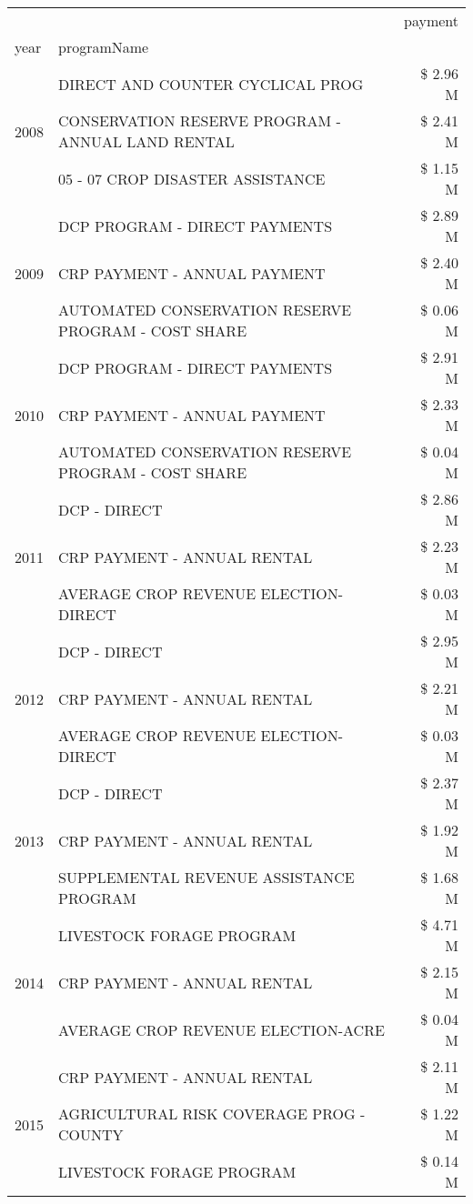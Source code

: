 \begin{tabular}{llr}
\toprule
 &  & payment \\
year & programName &  \\
\midrule
\multirow[t]{3}{*}{2008} & DIRECT AND COUNTER CYCLICAL PROG & \$ 2.96 M \\
 & CONSERVATION RESERVE PROGRAM - ANNUAL LAND RENTAL & \$ 2.41 M \\
 & 05 - 07 CROP DISASTER ASSISTANCE & \$ 1.15 M \\
\cline{1-3}
\multirow[t]{3}{*}{2009} & DCP PROGRAM - DIRECT PAYMENTS & \$ 2.89 M \\
 & CRP PAYMENT - ANNUAL PAYMENT & \$ 2.40 M \\
 & AUTOMATED CONSERVATION RESERVE PROGRAM - COST SHARE & \$ 0.06 M \\
\cline{1-3}
\multirow[t]{3}{*}{2010} & DCP PROGRAM - DIRECT PAYMENTS & \$ 2.91 M \\
 & CRP PAYMENT - ANNUAL PAYMENT & \$ 2.33 M \\
 & AUTOMATED CONSERVATION RESERVE PROGRAM - COST SHARE & \$ 0.04 M \\
\cline{1-3}
\multirow[t]{3}{*}{2011} & DCP - DIRECT & \$ 2.86 M \\
 & CRP PAYMENT - ANNUAL RENTAL & \$ 2.23 M \\
 & AVERAGE CROP REVENUE ELECTION-DIRECT & \$ 0.03 M \\
\cline{1-3}
\multirow[t]{3}{*}{2012} & DCP - DIRECT & \$ 2.95 M \\
 & CRP PAYMENT - ANNUAL RENTAL & \$ 2.21 M \\
 & AVERAGE CROP REVENUE ELECTION-DIRECT & \$ 0.03 M \\
\cline{1-3}
\multirow[t]{3}{*}{2013} & DCP - DIRECT & \$ 2.37 M \\
 & CRP PAYMENT - ANNUAL RENTAL & \$ 1.92 M \\
 & SUPPLEMENTAL REVENUE ASSISTANCE PROGRAM & \$ 1.68 M \\
\cline{1-3}
\multirow[t]{3}{*}{2014} & LIVESTOCK FORAGE PROGRAM & \$ 4.71 M \\
 & CRP PAYMENT - ANNUAL RENTAL & \$ 2.15 M \\
 & AVERAGE CROP REVENUE ELECTION-ACRE & \$ 0.04 M \\
\cline{1-3}
\multirow[t]{3}{*}{2015} & CRP PAYMENT - ANNUAL RENTAL & \$ 2.11 M \\
 & AGRICULTURAL RISK COVERAGE PROG - COUNTY & \$ 1.22 M \\
 & LIVESTOCK FORAGE PROGRAM & \$ 0.14 M \\

\end{tabular}
